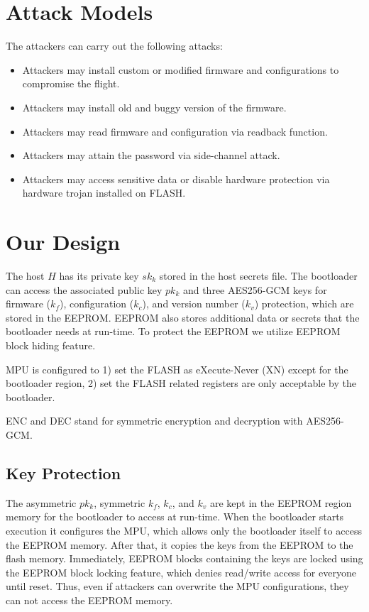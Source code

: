 \documentclass[11pt,oneside,onecolumn,letterpaper]{article}
\begin{document}
\section{Attack Models}

The attackers can carry out the following attacks:

\begin{itemize}
  \item Attackers may install custom or modified firmware and configurations to compromise the flight.
  \item Attackers may install old and buggy version of the firmware.
  \item Attackers may read firmware and configuration via readback function.
  \item Attackers may attain the password via side-channel attack.
  \item Attackers may access sensitive data or disable hardware protection via hardware trojan installed on FLASH.
\end{itemize}


\section{Our Design}

The host $H$ has its private key $sk_k$ stored in the host secrets file.
The bootloader can access the associated public key $pk_k$ and three AES256-GCM keys for firmware ($k_f$), configuration ($k_c$), and version number ($k_v$) protection, which are stored in the EEPROM.
EEPROM also stores additional data or secrets that the bootloader needs at run-time.
To protect the EEPROM we utilize EEPROM block hiding feature.

MPU is configured to 1) set the FLASH as eXecute-Never (XN) except for the bootloader region, 2) set the FLASH related registers are only acceptable by the bootloader. 

ENC and DEC stand for symmetric encryption and decryption with AES256-GCM.

\subsection{Key Protection}
The asymmetric $pk_k$, symmetric $k_f$, $k_c$, and $k_v$ are kept in the EEPROM region memory for the bootloader to access at run-time.
When the bootloader starts execution it configures the MPU, which allows only the bootloader itself to access the EEPROM memory.
After that, it copies the keys from the EEPROM to the flash memory.
Immediately, EEPROM blocks containing the keys are locked using the EEPROM block locking feature, which denies read/write access for everyone until reset.
Thus, even if attackers can overwrite the MPU configurations, they can not access the EEPROM memory.
\end{document}
